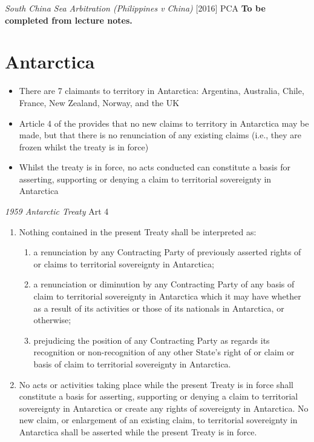 \begin{casedetails}{\textit{South China Sea Arbitration (Philippines v China)} [2016] PCA}
    \flushleft
    \textbf{To be completed from lecture notes.}
\end{casedetails}

\section{Antarctica}
\begin{itemize}
    \item There are 7 claimants to territory in Antarctica: Argentina, Australia, Chile, France, New Zealand, Norway, and the UK
    \item Article 4 of the  provides that no new claims to territory in Antarctica may be made, but that there is no renunciation of any existing claims (i.e., they are frozen whilst the treaty is in force)
    \item Whilst the treaty is in force, no acts conducted can constitute a basis for asserting, supporting or denying a claim to territorial sovereignty in Antarctica
\end{itemize}

\begin{conventiondetails}{\textit{1959 Antarctic Treaty} Art 4}
    \flushleft 
    \begin{enumerate}
        \item Nothing contained in the present Treaty shall be interpreted as:
        \begin{enumerate}[label=(\alph*)]
            \item a renunciation by any Contracting Party of previously asserted rights of or claims to territorial sovereignty in Antarctica;
            \item a renunciation or diminution by any Contracting Party of any basis of claim to territorial sovereignty in Antarctica which it may have whether as a result of its activities or those of its nationals in Antarctica, or otherwise;
            \item prejudicing the position of any Contracting Party as regards its recognition or non-recognition of any other State’s right of or claim or basis of claim to territorial sovereignty in Antarctica.
        \end{enumerate}
        \item No acts or activities taking place while the present Treaty is in force shall 
        constitute a basis for asserting, supporting or denying a claim to territorial 
        sovereignty in Antarctica or create any rights of sovereignty in Antarctica. No new 
        claim, or enlargement of an existing claim, to territorial sovereignty in Antarctica 
        shall be asserted while the present Treaty is in force.
    \end{enumerate}
\end{conventiondetails}

